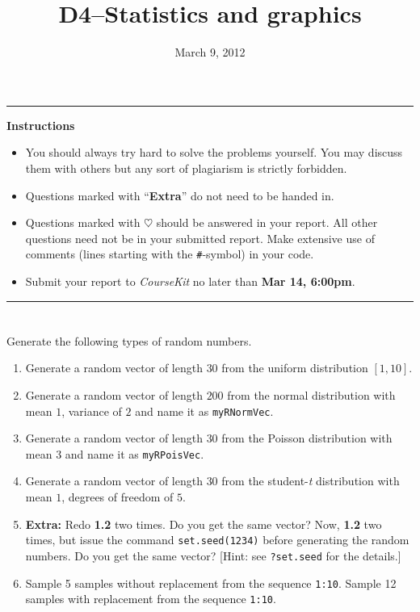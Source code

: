 \documentclass[a4paper]{article}
\title{D4--Statistics and graphics}
\date{March 9, 2012}
\begin{document}
\maketitle
\hrule
\begin{center}
\textbf{Instructions}
\end{center}
\begin{itemize}
\item You should always try hard to solve the problems yourself. You may
  discuss them with others but any sort of plagiarism is strictly forbidden.

\item Questions marked with ``\textbf{Extra}'' do not need to be handed in. 

\item Questions marked with $\heartsuit$ should be answered in your report. All
  other questions need not be in your submitted report. Make extensive use of
  comments (lines starting with the \texttt{\#}-symbol) in your code.

\item Submit your report to \emph{CourseKit} no later than \textbf{Mar 14,
    6:00pm}.
\end{itemize}
\hrule
  
\section{}
Generate the following types of random numbers.
\begin{enumerate}
\item Generate a random vector of length $30$ from the uniform distribution
  $[1,10]$.

\item Generate a random vector of length $200$ from the normal distribution with
  mean $1$, variance of $2$ and name it as \texttt{myRNormVec}.

\item Generate a random vector of length $30$ from the Poisson distribution with
  mean $3$ and name it as \texttt{myRPoisVec}.

\item Generate a random vector of length $30$ from the student-\emph{t}
  distribution with mean $1$, degrees of freedom of $5$.

\item \textbf{Extra:} Redo \textbf{1.2}  two times. Do you get the same vector?
  Now, \textbf{1.2} two times, but issue the command
  \texttt{set.seed(1234)} before generating the random numbers. Do you get the same vector?
  [Hint: see \texttt{?set.seed} for the details.]

\item Sample 5 samples without replacement from the sequence
  \texttt{1:10}. Sample 12 samples with replacement from the sequence
  \texttt{1:10}.
\end{enumerate}
\end{document}
